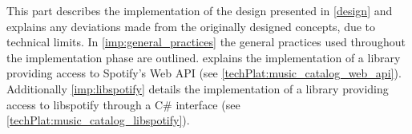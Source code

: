 This part describes the implementation of the design presented in \cref{design} and explains any deviations made from the originally designed concepts, due to technical limits. In \cref{imp:general_practices} the general practices used throughout the implementation phase are outlined.  explains the implementation of a library providing access to Spotify's Web API (see \cref{techPlat:music_catalog_web_api}). Additionally \cref{imp:libspotify} details the implementation of a library providing access to libspotify through a C\# interface (see \cref{techPlat:music_catalog_libspotify}).
